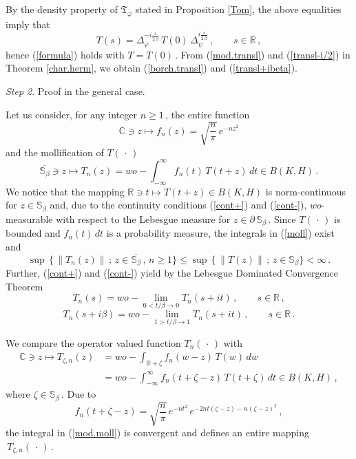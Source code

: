 \documentclass[reqno]{amsart}
\theoremstyle{definition}
\theoremstyle{remark}
\numberwithin{equation}{section}
\theoremstyle{plain}
\begin{document}
By the density property of $\mathfrak T_\varphi$ stated in
Proposition \ref{Tom}, the above equalities imply that
\begin{equation*}
T(s)=\Delta_\varphi^{-i \frac s{2\,\beta}}\, T(0)\,
\Delta_\psi^{i \frac s{2\,\beta}}\, ,\qquad s\in\mathbb R\, ,
\end{equation*}
hence (\ref{formula}) holds with $T=T(0)\,$. From (\ref{mod.transl})
and (\ref{transl-i/2}) in Theorem \ref{char.herm}, we obtain
(\ref{borch.transl}) and (\ref{transl+ibeta}).
\bigskip

{\it Step 2}. {\sc Proof in the general case.}
\medskip

Let us consider, for any integer $n\geq 1\,$, the entire function
\begin{equation*}
\mathbb C\ni z\longmapsto f_n(z)=\sqrt{\frac n{\pi}}\, e^{-n z^2}
\end{equation*}
and the mollification of $T(\,\cdot\, )$
\begin{equation}\label{moll}
\overline{\mathbb S_\beta}\ni z\longmapsto T_n(z)=
wo-\int_{-\infty}^\infty f_n(t)\, T(t+z)\, dt\in B(K,H)\, .
\end{equation}
We notice that the mapping $\mathbb R\ni t\longmapsto T(t+z)\in
B(K,H)$ is norm-continuous for $z\in\mathbb S_\beta$ and, due to
the continuity conditions (\ref{cont+}) and (\ref{cont-}), 
$wo$-measurable with respect to the Lebesgue measure for
$z\in\partial\,\mathbb S_\beta\,$. Since $T(\,\cdot\, )$ is bounded
and $f_n(t)\, dt$ is a probability measure, the integrals in
(\ref{moll}) exist and
\begin{equation}\label{bdd}
\sup\,\{\,\| T_n(z)\|\, ;\, z\in\overline{\mathbb S_\beta}\, ,\, n
\geq 1\}\leq \sup\,\{\,\| T(z)\|\, ;\, z\in\mathbb S_\beta\}
<\infty\, .
\end{equation}
Further, (\ref{cont+}) and (\ref{cont-}) yield by the Lebesgue
Dominated Convergence Theorem
\begin{equation}\label{moll.cont+}
T_n(s)=wo - \lim_{0<t/\beta \to 0} T_n(s+it)\, ,\qquad
s\in\mathbb R\, ,
\end{equation}
\begin{equation}\label{moll.cont-}
T_n(s+i\beta )=wo - \lim_{1>t/\beta \to 1} T_n(s+it)\, ,\qquad
s\in\mathbb R\, .
\end{equation}

We compare the operator valued function $T_n(\,\cdot\, )$ with
\begin{equation}\label{mod.moll}
\begin{split}
\mathbb C\ni z\longmapsto T_{\zeta ,n}(z)
&=wo-\int_{\mathbb R +\zeta} f_n(w-z)\, T(w)\, dw\\
&=wo-\int_{-\infty}^\infty f_n(t+\zeta -z)\, T(t+\zeta )\, dt
\in B(K,H)\, ,
\end{split}
\end{equation}
where $\zeta\in\mathbb S_\beta\,$. Due to
\begin{equation*}
f_n(t+\zeta -z)=\sqrt{\frac n{\pi}}\, e^{-n t^2}\,
e^{-2 n t (\zeta -z) -n (\zeta -z)^2}\, ,
\end{equation*}
the integral in (\ref{mod.moll}) is convergent and defines an entire
mapping $\, T_{\zeta ,n}(\,\cdot\, )\,$.
\end{document}
